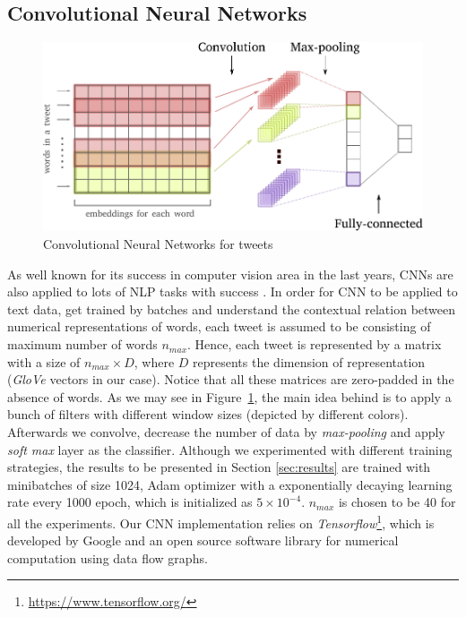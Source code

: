 \subsection{Convolutional Neural Networks}
\begin{figure}[t]
	\centering
	\includegraphics[width=0.8\columnwidth]{CNN_text.pdf}
	\caption{Convolutional Neural Networks for tweets}
	\label{fig:cnn}
\end{figure}

As well known for its success in computer vision area in the last years, CNNs are also applied to lots of NLP tasks with success \cite{kim14conv}. 
In order for CNN to be applied to text data, get trained by batches and understand the contextual relation between numerical representations of words, each tweet is assumed to be consisting of maximum number of words $n_{max}$. 
Hence, each tweet is represented by a matrix with a size of $n_{max} \times D$, where $D$ represents the dimension of representation (\textit{GloVe} vectors in our case).
Notice that all these matrices are zero-padded in the absence of words.
As we may see in Figure~\ref{fig:cnn}, the main idea behind is to apply a bunch of filters with different window sizes (depicted by different colors). Afterwards we convolve, decrease the number of data by \textit{max-pooling} and apply \textit{soft max} layer as the classifier.
Although we experimented with different training strategies, the results to be presented in Section \ref{sec:results} are trained with minibatches of size 1024, Adam optimizer with a exponentially decaying learning rate every 1000 epoch, which is initialized as $5 \times 10^{-4}$. 
$n_{max}$ is chosen to be 40 for all the experiments.
Our CNN implementation relies on \textit{Tensorflow}\footnote{\url{https://www.tensorflow.org/}}, which is developed by Google and an open source software library for numerical computation using data flow graphs.